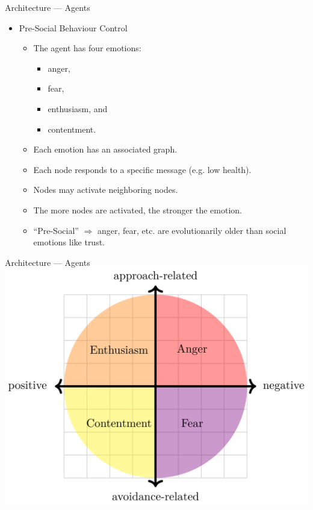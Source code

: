 \documentclass{beamer}
\def\tikzoverlay{%
   \tikz[baseline,overlay]\node[every overlay node]
}%
\begin{document}
   \begin{frame}{Architecture --- Agents}
      \begin{itemize}   
         \item Pre-Social Behaviour Control
         \pause
            \begin{itemize}
               \item The agent has four emotions:
                  \begin{itemize}
                     \item anger,
                     \item fear,
                     \item enthusiasm, and
                     \item contentment.   
                  \end{itemize}
               \pause
               \item Each emotion has an associated graph.
               \pause
               \item Each node responds to a specific message (e.g. low health).
               \pause
               \item Nodes may activate neighboring nodes.
               \pause
               \item The more nodes are activated, the stronger the emotion.
               \pause
               \vspace{3mm}
               \item ``Pre-Social'' $\Rightarrow$ anger, fear, etc. are evolutionarily older than social emotions like trust.
            \end{itemize}
      \end{itemize}
      
   \end{frame}
   
   \begin{frame}{Architecture --- Agents}
      \includegraphics[width=\textwidth]{../Thesis/Figs/PSBC.png}
   \end{frame}
   
\end{document}
